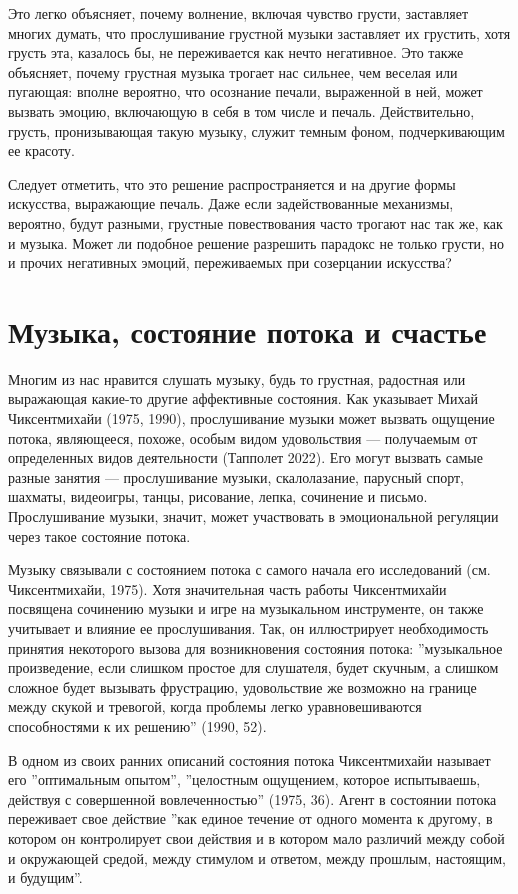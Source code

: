 \documentclass[11pt]{book}
\begin{document}
Это легко объясняет, почему волнение, включая чувство грусти, заставляет многих думать, что прослушивание грустной музыки заставляет их грустить, хотя грусть эта, казалось бы, не переживается как нечто негативное. Это также объясняет, почему грустная музыка трогает нас сильнее, чем веселая или пугающая: вполне вероятно, что осознание печали, выраженной в ней, может вызвать эмоцию, включающую в себя в том числе и печаль. Действительно, грусть, пронизывающая такую музыку, служит темным фоном, подчеркивающим ее красоту.

Следует отметить, что это решение распространяется и на другие формы искусства, выражающие печаль. Даже если задействованные механизмы, вероятно, будут разными, грустные повествования часто трогают нас так же, как и музыка. Может ли подобное решение разрешить парадокс не только грусти, но и прочих негативных эмоций, переживаемых при созерцании искусства?

\section{Музыка, состояние потока и счастье}

Многим из нас нравится слушать музыку, будь то грустная, радостная или выражающая какие-то другие аффективные состояния. Как указывает Михай Чиксентмихайи (1975, 1990), прослушивание музыки может вызвать ощущение потока, являющееся, похоже, особым видом удовольствия --- получаемым от определенных видов деятельности (Тапполет 2022). Его могут вызвать самые разные занятия --- прослушивание музыки, скалолазание, парусный спорт, шахматы, видеоигры, танцы, рисование, лепка, сочинение и письмо. Прослушивание музыки, значит, может участвовать в эмоциональной регуляции через такое состояние потока.

Музыку связывали с состоянием потока с самого начала его исследований (см. Чиксентмихайи, 1975). Хотя значительная часть работы Чиксентмихайи посвящена сочинению музыки и игре на музыкальном инструменте, он также учитывает и влияние ее прослушивания. Так, он иллюстрирует необходимость принятия некоторого вызова для возникновения состояния потока: ''музыкальное произведение, если слишком простое для слушателя, будет скучным, а слишком сложное будет вызывать фрустрацию, удовольствие же возможно на границе между скукой и тревогой, когда проблемы легко уравновешиваются способностями к их решению'' (1990, 52).

В одном из своих ранних описаний состояния потока Чиксентмихайи называет его ''оптимальным опытом'', ''целостным ощущением, которое испытываешь, действуя с совершенной вовлеченностью'' (1975, 36). Агент в состоянии потока переживает свое действие ''как единое течение от одного момента к другому, в котором он контролирует свои действия и в котором мало различий между собой и окружающей средой, между стимулом и ответом, между прошлым, настоящим, и будущим''.
\end{document}
